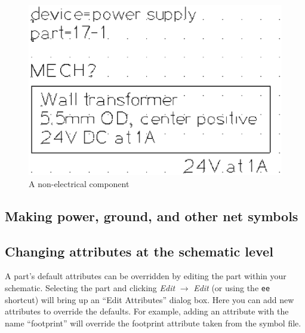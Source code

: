 \begin{figure}[ht]
	\begin{center}
		\includegraphics[clip,scale=0.4]{wall_xformer_24v_1a.ps}
		\caption{A non-electrical component\label{non_electric}}
	\end{center} 
\end{figure}

\subsection{Making power, ground, and other net symbols}


\subsection{Changing attributes at the schematic level}
A part's default attributes can be overridden by editing the part within your schematic.  Selecting the part and clicking \textsl{Edit} $\rightarrow$ \textsl{Edit} (or using the \texttt{ee} shortcut) will bring up an ``Edit Attributes'' dialog box.  Here you can add new attributes to override the defaults.  For example, adding an attribute with the name ``footprint'' will override the footprint attribute taken from the symbol file.

